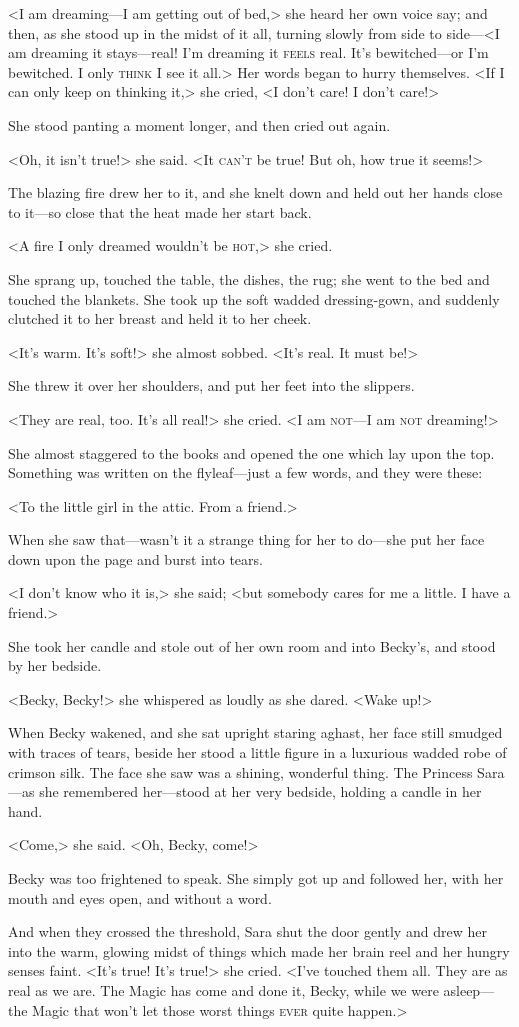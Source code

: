 <I am dreaming—I am getting out of bed,> she heard her own voice say; and then, as she stood up in the midst of it all, turning slowly from side to side—<I am dreaming it stays—real! I'm dreaming it \textsc{feels} real. It's bewitched—or I'm bewitched. I only \textsc{think} I see it all.> Her words began to hurry themselves. <If I can only keep on thinking it,> she cried, <I don't care! I don't care!>

She stood panting a moment longer, and then cried out again.

<Oh, it isn't true!> she said. <It \textsc{can't} be true! But oh, how true it seems!>

The blazing fire drew her to it, and she knelt down and held out her hands close to it—so close that the heat made her start back.

<A fire I only dreamed wouldn't be \textsc{hot},> she cried.

She sprang up, touched the table, the dishes, the rug; she went to the bed and touched the blankets. She took up the soft wadded dressing-gown, and suddenly clutched it to her breast and held it to her cheek.

<It's warm. It's soft!> she almost sobbed. <It's real. It must be!>

She threw it over her shoulders, and put her feet into the slippers.

<They are real, too. It's all real!> she cried. <I am \textsc{not}—I am \textsc{not} dreaming!>

She almost staggered to the books and opened the one which lay upon the top. Something was written on the flyleaf—just a few words, and they were these:

<To the little girl in the attic. From a friend.>

When she saw that—wasn't it a strange thing for her to do—she put her face down upon the page and burst into tears.

<I don't know who it is,> she said; <but somebody cares for me a little. I have a friend.>

She took her candle and stole out of her own room and into Becky's, and stood by her bedside.

<Becky, Becky!> she whispered as loudly as she dared. <Wake up!>

When Becky wakened, and she sat upright staring aghast, her face still smudged with traces of tears, beside her stood a little figure in a luxurious wadded robe of crimson silk. The face she saw was a shining, wonderful thing. The Princess Sara—as she remembered her—stood at her very bedside, holding a candle in her hand.

<Come,> she said. <Oh, Becky, come!>

Becky was too frightened to speak. She simply got up and followed her, with her mouth and eyes open, and without a word.

And when they crossed the threshold, Sara shut the door gently and drew her into the warm, glowing midst of things which made her brain reel and her hungry senses faint. <It's true! It's true!> she cried. <I've touched them all. They are as real as we are. The Magic has come and done it, Becky, while we were asleep—the Magic that won't let those worst things \textsc{ever} quite happen.>